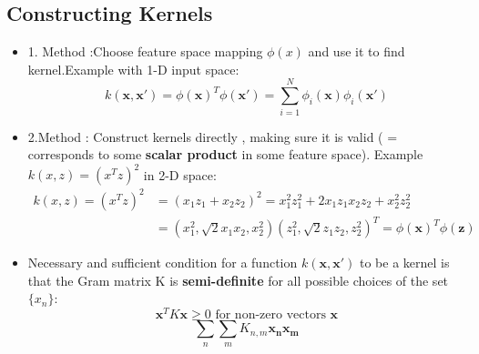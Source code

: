 \documentclass[12pt]{article} %
\begin{document}
\subsection{Constructing Kernels}
\begin{itemize}
\item 1. Method :Choose feature space mapping $\phi(x)$ and use it to find kernel.Example with 1-D input space:
$$ k(\bm{x,x'})=\phi(\bm{x})^T \phi(\bm{x'}) = \sum \limits_{i=1}^N \phi_i(\bm{x})\phi_i(\bm{x'})$$

\item 2.Method : Construct kernels directly , making sure it is valid ( = corresponds to some \textbf{scalar product} in some feature space). Example $k(x,z) =(x^Tz)^2$ in 2-D space: 
\begin{align*}
 k(x,z)=(x^Tz)^2 &=(x_1z_1+x_2z_2)^2=x_1^2z_1^2+2x_1z_1x_2z_2+x_2^2z_2^2\\
 &=(x^2_1,\sqrt{2}x_1x_2,x^2_2)(z_1^2,\sqrt{2}z_1z_2,z^2_2)^T=\phi(\bm{x})^T\phi(\bm{z})
\end{align*}

\item Necessary and sufficient condition for a function $k(\bm{x,x'})$ to be a kernel is that the Gram matrix K is \textbf{semi-definite} for all possible choices of the set $\{ x_n \}$:
$$ \bm{x}^TK\bm{x} \geq 0 \text{ for non-zero vectors } \bm{x}$$
$$ \sum \limits_n \sum \limits_m K_{n,m}\bm{x_n}\bm{x_m}$$
\begin{center}
\end{center}
\end{itemize}
\end{document}
